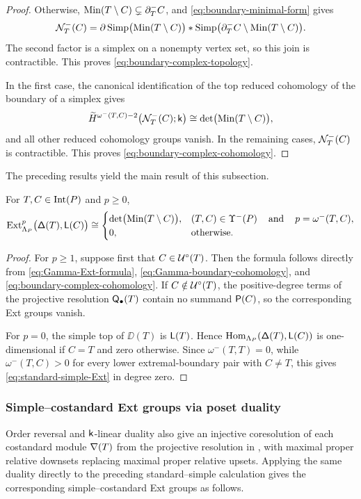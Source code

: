 \begin{proof}
Otherwise,
$\operatorname{Min}(T\setminus C)\subsetneq\partial_T^-C$, and
\eqref{eq:boundary-minimal-form} gives
\[
\mathcal N_T^-(C)
=
\partial\operatorname{Simp}\bigl(\operatorname{Min}(T\setminus C)\bigr)
*
\operatorname{Simp}\bigl(
\partial_T^-C\setminus\operatorname{Min}(T\setminus C)
\bigr).
\]
The second factor is a simplex on a nonempty vertex set, so this join
is contractible. This proves
\eqref{eq:boundary-complex-topology}.

In the first case, the canonical identification of the top reduced
cohomology of the boundary of a simplex gives
\[
\widetilde H^{\omega^-(T,C)-2}
\bigl(\mathcal N_T^-(C);\mathsf{k}\bigr)
\cong
\det\bigl(\operatorname{Min}(T\setminus C)\bigr),
\]
and all other reduced cohomology groups vanish. In the remaining
cases, $\mathcal N_T^-(C)$ is contractible. This proves
\eqref{eq:boundary-complex-cohomology}.
\end{proof}


The preceding results yield the main result of this subsection.

\begin{theorem}
\label{thm:standard-simple-ext-formula}
For $T,C\in\operatorname{Int}(P)$ and $p\geq0$,
\begin{equation}
\label{eq:standard-simple-Ext}
\operatorname{Ext}^p_{\Lambda_P}\bigl(\mathsf\Delta(T),\mathsf L(C)\bigr)
\cong
\begin{cases}
\det\bigl(\operatorname{Min}(T\setminus C)\bigr),
&
(T,C)\in\Upsilon^-(P)
\operatorname{\quad \text{and} \quad}\nolimits
p=\omega^-(T,C),
\\
0,
&
\text{otherwise}.
\end{cases}
\end{equation}
\end{theorem}


\begin{proof}
For $p\geq1$, suppose first that $C\in\mathcal U^\circ(T)$.
Then the formula follows directly from
\eqref{eq:Gamma-Ext-formula},
\eqref{eq:Gamma-boundary-cohomology}, and
\eqref{eq:boundary-complex-cohomology}.
If $C\notin\mathcal U^\circ(T)$, the positive-degree terms of the projective
resolution $\mathsf Q_\bullet(T)$ contain no summand $\mathsf P(C)$, so the
corresponding Ext groups vanish.

For $p=0$, the simple top of $\DD(T)$ is $\mathsf L(T)$. Hence
$\operatorname{Hom}_{\Lambda_P}(\mathsf\Delta(T),\mathsf L(C))$ is one-dimensional if $C=T$ and
zero otherwise. Since $\omega^-(T,T)=0$, while $\omega^-(T,C)>0$ for
every lower extremal-boundary pair with $C\neq T$, this gives
\eqref{eq:standard-simple-Ext} in degree zero.
\end{proof}



\subsubsection{Simple--costandard Ext groups via poset duality}
\label{subsec:simple-costandard-ext-via-poset-duality}
Order reversal and $\mathsf{k}$-linear duality also give an injective
coresolution of each costandard module $\mathsf\nabla(T)$ from the projective
resolution in , with maximal
proper relative downsets replacing maximal proper relative upsets.
Applying the same duality directly to the preceding standard--simple
calculation gives the corresponding simple--costandard Ext groups as
follows.


